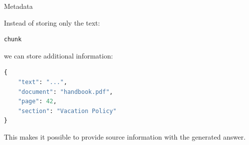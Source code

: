 \documentclass[aspectratio=169]{beamer}
\begin{document}






\begin{frame}[fragile]{Metadata}

Instead of storing only the text:

\begin{lstlisting}[language=Python]
chunk
\end{lstlisting}

we can store additional information:

\begin{lstlisting}[language=Python]
{
    "text": "...",
    "document": "handbook.pdf",
    "page": 42,
    "section": "Vacation Policy"
}
\end{lstlisting}

This makes it possible to provide source information
with the generated answer.

\end{frame}
\end{document}
